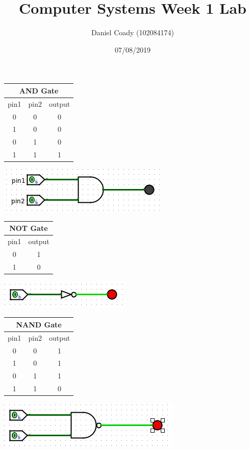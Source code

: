 \documentclass[12pt]{article}
\title{Computer Systems Week 1 Lab}
\author{Daniel Coady (102084174)}
\date{07/08/2019}
\begin{document}
\maketitle

\begin{center}
    \begin{tabular}{|c|c|c|}
        \hline
        \multicolumn{3}{|c|}{AND Gate} \\
        \hline
        pin1 & pin2 & output \\
        \hline\hline
        0 & 0 & 0 \\
        \hline
        1 & 0 & 0 \\
        \hline
        0 & 1 & 0 \\
        \hline
        1 & 1 & 1 \\
        \hline
    \end{tabular}
\end{center}
\centering\includegraphics{images/andgate.png}

\begin{center}
    \begin{tabular}{|c|c|}
        \hline
        \multicolumn{2}{|c|}{NOT Gate} \\
        \hline
        pin1 & output \\
        \hline\hline
        0 & 1 \\
        \hline
        1 & 0 \\
        \hline
    \end{tabular}
\end{center}
\centering\includegraphics{images/notgate.png}

\begin{center}
    \begin{tabular}{|c|c|c|}
        \hline
        \multicolumn{3}{|c|}{NAND Gate} \\
        \hline
        pin1 & pin2 & output \\
        \hline\hline
        0 & 0 & 1 \\
        \hline
        1 & 0 & 1 \\
        \hline
        0 & 1 & 1 \\
        \hline
        1 & 1 & 0 \\
        \hline
    \end{tabular}
\end{center}
\centering\includegraphics[scale=0.5]{images/nandgate.png}
\end{document}

